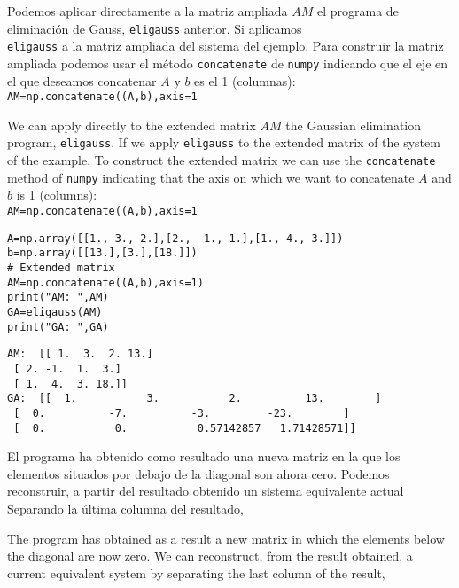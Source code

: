 \begin{paracol}{2}   
Podemos aplicar directamente a la matriz ampliada $AM$ el programa de eliminación de Gauss, \texttt{eligauss} anterior. Si aplicamos \\ \texttt{eligauss} a la matriz ampliada del sistema del ejemplo. Para construir la matriz ampliada podemos usar el método \texttt{concatenate} de  \texttt{numpy} indicando que el  eje en el que deseamos concatenar $A$ y $b$ es el 1 (columnas):\\ \texttt{AM=np.concatenate((A,b),axis=1}

\switchcolumn

We can apply directly to the extended matrix $AM$ the Gaussian elimination program, \texttt{eligauss}. If we apply \texttt{eligauss} to the extended matrix of the system of the example. 
To construct the extended matrix we can use the \texttt{concatenate} method of \texttt{numpy} indicating that the axis on which we want to concatenate $A$ and $b$ is 1 (columns):\\ \texttt{AM=np.concatenate((A,b),axis=1}
\end{paracol}

\begin{verbatim}
A=np.array([[1., 3., 2.],[2., -1., 1.],[1., 4., 3.]])
b=np.array([[13.],[3.],[18.]])
# Extended matrix
AM=np.concatenate((A,b),axis=1)
print("AM: ",AM)
GA=eligauss(AM)
print("GA: ",GA)    
\end{verbatim}

\begin{verbatim}
AM:  [[ 1.  3.  2. 13.]
 [ 2. -1.  1.  3.]
 [ 1.  4.  3. 18.]]
GA:  [[  1.           3.           2.          13.        ]
 [  0.          -7.          -3.         -23.        ]
 [  0.           0.           0.57142857   1.71428571]]   
\end{verbatim}

\begin{paracol}{2}
El programa ha obtenido como resultado una nueva matriz en la que los elementos situados por debajo de la diagonal son ahora cero. Podemos reconstruir, a partir del resultado obtenido un sistema equivalente actual Separando la última columna del resultado,

\switchcolumn
The program has obtained as a result a new matrix in which the elements below the diagonal are now zero. We can reconstruct, from the result obtained, a current equivalent system by separating the last column of the result,
\end{paracol}

